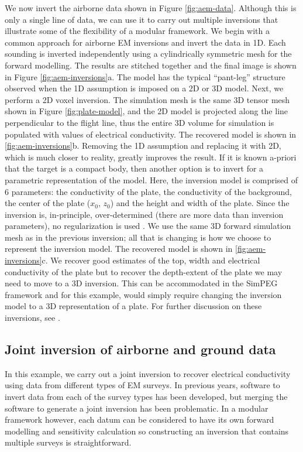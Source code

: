 \documentclass[paper]{geophysics}
\begin{document}
We now invert the airborne data shown in Figure \ref{fig:aem-data}. Although this is only a single line of data, we can use it to carry out multiple inversions that illustrate some of the flexibility of a modular framework. We begin with a  common approach for airborne EM inversions and invert the data in 1D. Each sounding is inverted independently using a cylindrically symmetric mesh for the forward modelling. The results are stitched together and the final image is shown in Figure \ref{fig:aem-inversions}a. The model has the typical ``pant-leg'' structure observed when the 1D assumption is imposed on a 2D or 3D model. Next, we perform a 2D voxel inversion. The simulation mesh is the same 3D tensor mesh shown in Figure \ref{fig:plate-model}, and the 2D model is projected along the line perpendicular to the flight line, thus the entire 3D volume for simulation is populated with values of electrical conductivity.  The recovered model is shown in \ref{fig:aem-inversions}b. Removing the 1D assumption and replacing it with  2D, which is much closer to reality, greatly improves the result. If it is known a-priori that the target is a compact body, then another option is to invert for a parametric representation of the model. Here, the inversion model is comprised of 6 parameters: the conductivity of the plate, the conductivity of the background, the center of the plate ($x_0$, $z_0$) and the height and width of the plate. Since the inversion is, in-principle, over-determined (there are more data than inversion parameters), no regularization is used \citep{Menke2012}. We use the same 3D forward simulation mesh as in the previous inversion; all that is changing is how we choose to represent the inversion model. The recovered model is shown in \ref{fig:aem-inversions}c. We recover good estimates of the top, width and electrical conductivity of the plate but to recover the depth-extent of the plate we may need to move to a 3D inversion. This can be accommodated in the SimPEG framework and for this example, would simply require changing the inversion model to a 3D representation of a plate. For further discussion on these inversions, see \cite{Heagy2018}.






\subsection{Joint inversion of airborne and ground data}

In this example, we carry out a joint inversion to recover electrical conductivity using data from different types of EM surveys. In previous years, software to invert data from each of the survey types has been developed, but merging the software to generate a joint inversion has been problematic. In a modular framework however, each datum can be considered to have its own forward modelling and sensitivity calculation so constructing an inversion that contains multiple surveys is straightforward.
\end{document}
